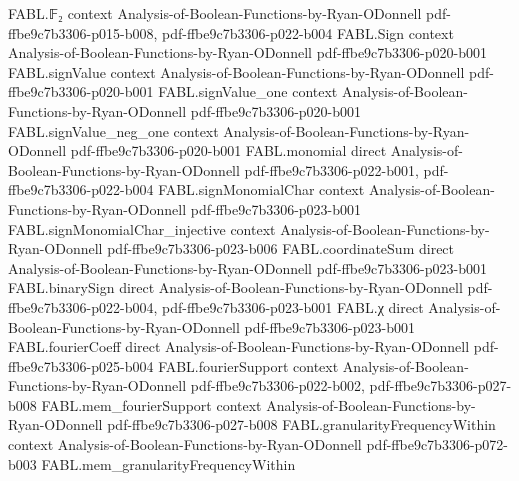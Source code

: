\begin{theorem}
\label{FABL.tendsto_tribesCriticalBase_pow_size_sub_one}
\leanok
{}
\proofstep
  {FABL.𝔽₂}
  {context}
  {Analysis-of-Boolean-Functions-by-Ryan-ODonnell}
  {pdf-ffbe9c7b3306-p015-b008,
    pdf-ffbe9c7b3306-p022-b004}
\proofstep
  {FABL.Sign}
  {context}
  {Analysis-of-Boolean-Functions-by-Ryan-ODonnell}
  {pdf-ffbe9c7b3306-p020-b001}
\proofstep
  {FABL.signValue}
  {context}
  {Analysis-of-Boolean-Functions-by-Ryan-ODonnell}
  {pdf-ffbe9c7b3306-p020-b001}
\proofstep
  {FABL.signValue_one}
  {context}
  {Analysis-of-Boolean-Functions-by-Ryan-ODonnell}
  {pdf-ffbe9c7b3306-p020-b001}
\proofstep
  {FABL.signValue_neg_one}
  {context}
  {Analysis-of-Boolean-Functions-by-Ryan-ODonnell}
  {pdf-ffbe9c7b3306-p020-b001}
\proofstep
  {FABL.monomial}
  {direct}
  {Analysis-of-Boolean-Functions-by-Ryan-ODonnell}
  {pdf-ffbe9c7b3306-p022-b001,
    pdf-ffbe9c7b3306-p022-b004}
\proofstep
  {FABL.signMonomialChar}
  {context}
  {Analysis-of-Boolean-Functions-by-Ryan-ODonnell}
  {pdf-ffbe9c7b3306-p023-b001}
\proofstep
  {FABL.signMonomialChar_injective}
  {context}
  {Analysis-of-Boolean-Functions-by-Ryan-ODonnell}
  {pdf-ffbe9c7b3306-p023-b006}
\proofstep
  {FABL.coordinateSum}
  {direct}
  {Analysis-of-Boolean-Functions-by-Ryan-ODonnell}
  {pdf-ffbe9c7b3306-p023-b001}
\proofstep
  {FABL.binarySign}
  {direct}
  {Analysis-of-Boolean-Functions-by-Ryan-ODonnell}
  {pdf-ffbe9c7b3306-p022-b004,
    pdf-ffbe9c7b3306-p023-b001}
\proofstep
  {FABL.χ}
  {direct}
  {Analysis-of-Boolean-Functions-by-Ryan-ODonnell}
  {pdf-ffbe9c7b3306-p023-b001}
\proofstep
  {FABL.fourierCoeff}
  {direct}
  {Analysis-of-Boolean-Functions-by-Ryan-ODonnell}
  {pdf-ffbe9c7b3306-p025-b004}
\proofstep
  {FABL.fourierSupport}
  {context}
  {Analysis-of-Boolean-Functions-by-Ryan-ODonnell}
  {pdf-ffbe9c7b3306-p022-b002,
    pdf-ffbe9c7b3306-p027-b008}
\proofstep
  {FABL.mem_fourierSupport}
  {context}
  {Analysis-of-Boolean-Functions-by-Ryan-ODonnell}
  {pdf-ffbe9c7b3306-p027-b008}
\proofstep
  {FABL.granularityFrequencyWithin}
  {context}
  {Analysis-of-Boolean-Functions-by-Ryan-ODonnell}
  {pdf-ffbe9c7b3306-p072-b003}
\proofstep
  {FABL.mem_granularityFrequencyWithin}

\end{theorem}

